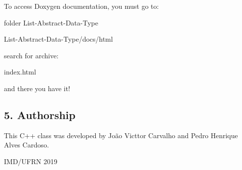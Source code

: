 To access Doxygen documentation, you must go to\+:

{\ttfamily folder List-\/\+Abstract-\/\+Data-\/\+Type}

{\ttfamily List-\/\+Abstract-\/\+Data-\/\+Type/docs/html}

search for archive\+:

{\ttfamily index.\+html}

and there you have it!

\subsection*{5. Authorship}

This C++ class was developed by João Victtor Carvalho and Pedro Henrique Alves Cardoso.

I\+M\+D/\+U\+F\+RN 2019 